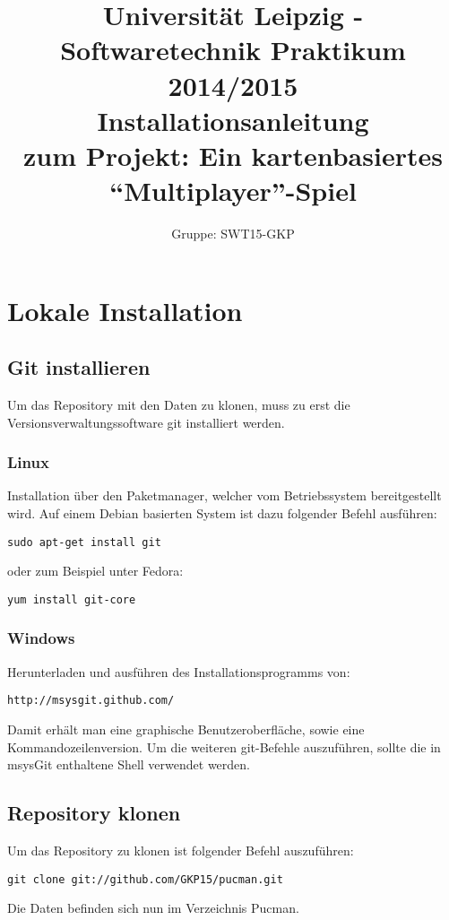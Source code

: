 \documentclass[11pt,a4paper]{article}
\author{Gruppe: SWT15-GKP}
\title{Universität Leipzig - Softwaretechnik Praktikum 2014/2015 \\  Installationsanleitung \\ zum Projekt: Ein kartenbasiertes “Multiplayer”-Spiel}
\begin{document}
\maketitle

\tableofcontents

\clearpage

\section{Lokale Installation}
\subsection{Git installieren}
Um das Repository mit den Daten zu klonen, muss zu erst die Versionsverwaltungssoftware git installiert werden.
\subsubsection{Linux}
Installation über den Paketmanager, welcher vom Betriebssystem bereitgestellt wird.
Auf einem Debian basierten System ist dazu folgender Befehl ausführen:
\begin{lstlisting}
sudo apt-get install git
\end{lstlisting}
oder zum Beispiel unter Fedora:
\begin{lstlisting}
yum install git-core
\end{lstlisting}
\subsubsection{Windows}
Herunterladen und ausführen des Installationsprogramms von:
\begin{lstlisting}
http://msysgit.github.com/
\end{lstlisting}
Damit erhält man eine graphische Benutzeroberfläche, sowie eine Kommandozeilenversion.
Um die weiteren git-Befehle auszuführen, sollte die in msysGit enthaltene Shell verwendet werden.
\subsection{Repository klonen}
Um das Repository zu klonen ist folgender Befehl auszuführen:
\begin{lstlisting}
git clone git://github.com/GKP15/pucman.git
\end{lstlisting}
Die Daten befinden sich nun im Verzeichnis Pucman.
\end{document}
